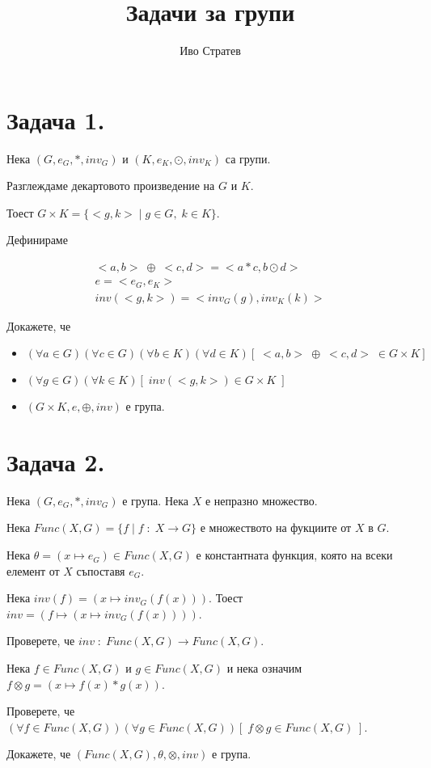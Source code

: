 \documentclass{article}[12pt]
\title{Задачи за групи}
\author{Иво Стратев}
\begin{document}
\maketitle

\section*{Задача 1.}

Нека \((G, e_G, *, inv_G)\) и \((K, e_K, \odot, inv_K)\) са групи.

Разглеждаме декартовото произведение на \(G\) и \(K\).

Тоест \(G \times K = \{<g, k> \; | \; g \in G, \; k \in K\}\).

Дефинираме 

\begin{align*}
<a, b> \; \oplus \; <c, d> = <a * c, b \odot d> \\
e = <e_G, e_K> \\
inv(<g, k>) = <inv_G(g), inv_K(k)>
\end{align*}

Докажете, че 

\begin{itemize}
\item \((\forall a \in G)(\forall c \in G)(\forall b \in K)(\forall d \in K)[\; <a, b> \; \oplus \; <c, d> \; \in G \times K] \;\)
\item \((\forall g \in G)(\forall k \in K)[\; inv(<g, k>) \in G \times K \;]\)
\item \((G \times K, e, \oplus, inv)\) е група.
\end{itemize}

\section*{Задача 2.}

Нека \((G, e_G, *, inv_G)\) е група. Нека \(X\) е непразно множество.

Нека \(Func(X, G) = \{f \; | \; f \; : \; X \to G\}\) е множеството на фукциите от \(X\) в \(G\).

Нека \(\theta = (x \mapsto e_G) \in Func(X, G)\) е константната функция, която на всеки елемент от \(X\) съпоставя \(e_G\).

Нека \(inv(f) = (x \mapsto inv_G(f(x)))\). Тоест \(inv = (f \mapsto (x \mapsto inv_G(f(x))))\).

Проверете, че \(inv \; : \; Func(X, G) \to Func(X, G)\).

Нека \(f \in Func(X, G)\) и \(g \in Func(X, G)\) и нека означим \\
\(f \otimes g = (x \mapsto f(x) * g(x))\).

Проверете, че \((\forall f \in Func(X, G))(\forall g \in Func(X, G))[\; f \otimes g \in Func(X, G) \;]\).

Докажете, че \((Func(X, G), \theta, \otimes, inv)\) е група.
\end{document}
